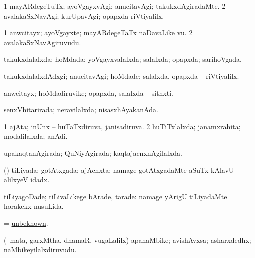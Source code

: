 \bentry
{} 
\gl{\kirxvi}
\expl{}
\bmng
\bnum
\num{1} mayARdegeTuTx; ayoVgayxvAgi; anucitavAgi; takukxdAgiradaMte. 
\num{2} avalakaSxNavAgi; kurUpavAgi; opapxda riVtiyalilx. 
\enum
\emng
\eentry

\bentry
{} 
\gl{\nA}
\expl{}
\bmng
\bnum
\num{1} anwcitayx; ayoVgayxte; mayARdegeTaTx naDavaLike \mo vu. 
\num{2} avalakaSxNavAgiruvudu. 
\enum
\emng
\eentry

\bentry
{} 
\gl{\gu}
\expl{}
\bmng
takukxdalalxda; hoMdada; yoVgayxvalalxda; salalxda; opapxda; sarihoVgada. 
\emng
\eentry

\bentry
{} 
\gl{\kirxvi}
\expl{}
\bmng
takukxdalalxdAdxgi; anucitavAgi; hoMdade; salalxda, opapxda -- riVtiyalilx. 
\emng
\eentry

\bentry
{} 
\gl{\nA}
\expl{}
\bmng
anwcitayx; hoMdadiruvike; opapxda, salalxda -- sithxti. 
\emng
\eentry

\bentry
{} 
\gl{\gu}
\expl{}
\bmng
senxVhitarirada; neravilalxda; nisasxhAyakanAda. 
\emng
\eentry

\bentry
{} 
\gl{\gu}
\expl{}
\bmng
\bnum
\num{1} ajAta; inUnx -- huTaTxdiruva, janisadiruva. 
\num{2} huTiTxlalxda; janamxrahita; modalilalxda; anAdi. 
\enum
\emng
\eentry

\bentry
{} 
\gl{\gu}
\expl{}
\bmng
upakaqtanAgirada; QuNiyAgirada; kaqtajacnxnAgilalxda. 
\emng
\eentry

\bentry
{} 
\gl{\gu}
\expl{}
\bmng
(\AmA) tiLiyada; gotAtxgada; ajAcnxta:  namage gotAtxgadaMte aSuTx kAlavU alilxyeV idadx. 
\emng

\noindent
\gl{\pagu}
\expl{}
\bmng
{} tiLiyagoDade; tiLivaLikege bArade, tarade:  namage yArigU tiLiyadaMte horakekx nusuLida. 
\emng
\eentry

\bentry
{} 
\gl{\gu}
\expl{}
\bmng
= \hyperlink{unbeknown}{unbeknown}. 
\emng
\eentry

\bentry
{} 
\gl{\nA}
\expl{}
\bmng
(\kanmu\ mata, garxMtha, dhamaR, \mo vugaLalilx) apanaMbike; avishAvxsa; asharxdedhx; naMbikeyilalxdiruvudu. 
\emng
\eentry

